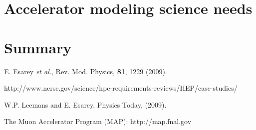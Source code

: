 \section{Accelerator modeling science needs}


\section{Summary}
\label{sec:acc-sc-summary}


\Acknowledgements




\begin{thebibliography}{99}



E. Esarey \textit{et al.}, Rev. Mod. Physics, \textbf{81}, 1229 (2009).

 http://www.nersc.gov/science/hpc-requirements-reviews/HEP/case-studies/

W.P. Leemans and E.  Esarey, Physics Today, (2009).


The Muon Accelerator Program (MAP): http://map.fnal.gov 

\end{thebibliography}



